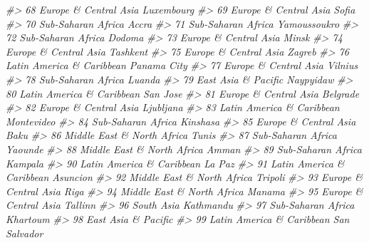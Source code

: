 \documentclass[
  xelatex, ja=standard]{bxjsbook}
\newenvironment{Shaded}{\begin{snugshade}}{\end{snugshade}}
\newcommand{\CommentTok}[1]{\textcolor[rgb]{0.56,0.35,0.01}{\textit{#1}}}
\theoremstyle{definition}
\theoremstyle{definition}
\theoremstyle{definition}
\theoremstyle{definition}
\theoremstyle{remark}
\begin{document}
\begin{Shaded}
\begin{Highlighting}[]
\CommentTok{\#\textgreater{} 68       Europe \& Central Asia          Luxembourg}
\CommentTok{\#\textgreater{} 69       Europe \& Central Asia               Sofia}
\CommentTok{\#\textgreater{} 70          Sub{-}Saharan Africa               Accra}
\CommentTok{\#\textgreater{} 71          Sub{-}Saharan Africa        Yamoussoukro}
\CommentTok{\#\textgreater{} 72          Sub{-}Saharan Africa              Dodoma}
\CommentTok{\#\textgreater{} 73       Europe \& Central Asia               Minsk}
\CommentTok{\#\textgreater{} 74       Europe \& Central Asia            Tashkent}
\CommentTok{\#\textgreater{} 75       Europe \& Central Asia              Zagreb}
\CommentTok{\#\textgreater{} 76   Latin America \& Caribbean         Panama City}
\CommentTok{\#\textgreater{} 77       Europe \& Central Asia             Vilnius}
\CommentTok{\#\textgreater{} 78          Sub{-}Saharan Africa              Luanda}
\CommentTok{\#\textgreater{} 79         East Asia \& Pacific           Naypyidaw}
\CommentTok{\#\textgreater{} 80   Latin America \& Caribbean            San Jose}
\CommentTok{\#\textgreater{} 81       Europe \& Central Asia            Belgrade}
\CommentTok{\#\textgreater{} 82       Europe \& Central Asia           Ljubljana}
\CommentTok{\#\textgreater{} 83   Latin America \& Caribbean          Montevideo}
\CommentTok{\#\textgreater{} 84          Sub{-}Saharan Africa            Kinshasa}
\CommentTok{\#\textgreater{} 85       Europe \& Central Asia                Baku}
\CommentTok{\#\textgreater{} 86  Middle East \& North Africa               Tunis}
\CommentTok{\#\textgreater{} 87          Sub{-}Saharan Africa             Yaounde}
\CommentTok{\#\textgreater{} 88  Middle East \& North Africa               Amman}
\CommentTok{\#\textgreater{} 89          Sub{-}Saharan Africa             Kampala}
\CommentTok{\#\textgreater{} 90   Latin America \& Caribbean              La Paz}
\CommentTok{\#\textgreater{} 91   Latin America \& Caribbean            Asuncion}
\CommentTok{\#\textgreater{} 92  Middle East \& North Africa             Tripoli}
\CommentTok{\#\textgreater{} 93       Europe \& Central Asia                Riga}
\CommentTok{\#\textgreater{} 94  Middle East \& North Africa              Manama}
\CommentTok{\#\textgreater{} 95       Europe \& Central Asia             Tallinn}
\CommentTok{\#\textgreater{} 96                  South Asia           Kathmandu}
\CommentTok{\#\textgreater{} 97          Sub{-}Saharan Africa            Khartoum}
\CommentTok{\#\textgreater{} 98         East Asia \& Pacific                    }
\CommentTok{\#\textgreater{} 99   Latin America \& Caribbean        San Salvador}

\end{Highlighting}
\end{Shaded}
\end{document}
